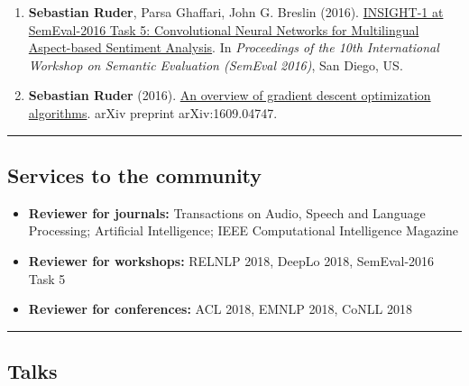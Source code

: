 \documentclass[10pt,letterpaper]{article}
\begin{document}
\begin{enumerate}
	\item \textbf{Sebastian Ruder}, Parsa Ghaffari, John G. Breslin (2016). \href{http://www.aclweb.org/anthology/S/S16/S16-1053.pdf}{INSIGHT-1 at SemEval-2016 Task 5: Convolutional Neural Networks for Multilingual Aspect-based Sentiment Analysis}. In \textit{Proceedings of the 10th International Workshop on Semantic Evaluation (SemEval 2016)}, San Diego, US.
	
	\item \textbf{Sebastian Ruder} (2016). \href{https://arxiv.org/pdf/1609.04747.pdf}{An overview of gradient descent optimization algorithms}. arXiv preprint arXiv:1609.04747.

\end{enumerate}

\hrule
\vspace{-0.4em}
\subsection*{Services to the community}

\begin{itemize}
	\parskip=0.1em
	
	\item \textbf{Reviewer for journals:} Transactions on Audio, Speech and Language Processing; Artificial Intelligence; IEEE Computational Intelligence Magazine
	
	\item \textbf{Reviewer for workshops:} RELNLP 2018, DeepLo 2018, SemEval-2016 Task 5
		
	\item \textbf{Reviewer for conferences:} ACL 2018, EMNLP 2018, CoNLL 2018

\end{itemize}

\hrule
\vspace{-0.4em}
\subsection*{Talks}
\end{document}
